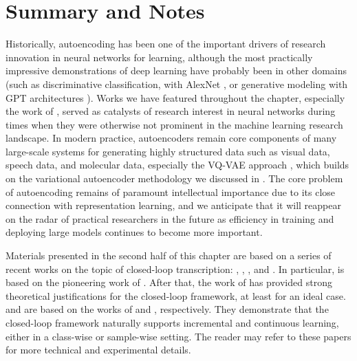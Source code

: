 \documentclass[../../book-main.tex]{subfiles}
\begin{document}
\section{Summary and Notes}
Historically, autoencoding has been one of the important drivers of research
innovation in neural networks for learning, although the most practically
impressive demonstrations of deep learning have probably been in other domains
(such as discriminative classification, with AlexNet
\cite{krizhevsky2012imagenet}, or generative modeling with GPT architectures
\cite{brown2020language}).
Works we have featured throughout the chapter, especially the work of
\cite{Hinton504}, served as catalysts of research interest in neural networks
during times when they were otherwise not prominent in the machine learning
research landscape.
In modern practice, autoencoders remain core components of many large-scale
systems for generating highly structured data such as visual data, speech data,
and molecular data, especially the VQ-VAE approach
\cite{van-den-Oord2017-jr}, which builds on the variational autoencoder
methodology we discussed in .
The core problem of autoencoding remains of paramount intellectual importance
due to its close connection with representation learning, and we anticipate that
it will reappear on the radar of practical researchers in the future as
efficiency in training and deploying large models continues to become more
important.

Materials presented in the second half of this chapter are based on a series of
recent works on the topic of closed-loop transcription: \cite{Dai-entropy-2022},
\cite{pai2022pursuit}, \cite{tong2023incremental}, and
\cite{pmlr-v234-tong24a}. In particular,
 is based on the pioneering work
of \cite{Dai-entropy-2022}. After that, the work of
\cite{pai2022pursuit} has provided strong theoretical justifications
for the closed-loop framework, at least for an ideal case.
 and
 are based on the works of
\cite{tong2023incremental} and \cite{pmlr-v234-tong24a},
respectively. They demonstrate that the closed-loop framework
naturally supports incremental and continuous learning, either in a
class-wise or sample-wise setting. The reader may refer to these
papers for more technical and experimental details.
\end{document}
